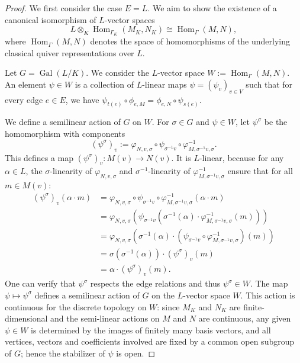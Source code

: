 \documentclass[a4paper,12pt,reqno]{amsart}
\DeclareMathOperator{\Hom}{\mathrm{Hom}}
\DeclareMathOperator{\Gal}{\mathrm {Gal}}
\theoremstyle{plain}
\theoremstyle{remark}
\begin{document}
  \begin{proof}
    We first consider the case $E=L$. We aim to show the existence of a canonical isomorphism of $L$-vector spaces
    \[
    L\otimes_K\Hom_{\Gamma_K}(M_K,N_K) \cong \Hom_{\Gamma}(M, N),
    \]
    where $\Hom_{\Gamma}(M, N)$ denotes the space of homomorphisms of the underlying classical quiver representations over $L$.
    
    Let $G = \Gal(L/K)$. We consider the $L$-vector space $W := \Hom_{\Gamma}(M, N)$. An element $\psi \in W$ is a collection of $L$-linear maps $\psi = (\psi_v)_{v\in V}$ such that for every edge $e \in E$, we have $\psi_{t(e)}\circ \phi_{e,M} = \phi_{e,N}\circ\psi_{s(e)}$.
    
    We define a semilinear action of $G$ on $W$. For $\sigma \in G$ and $\psi \in W$, let $\psi^\sigma$ be the homomorphism with components
    \[
    (\psi^\sigma)_v := \varphi_{N,v,\sigma} \circ \psi_{\sigma^{-1}v} \circ \varphi_{M,\sigma^{-1}v,\sigma}^{-1}.
    \]
    This defines a map $(\psi^\sigma)_v\colon M(v) \to N(v)$. It is $L$-linear, because for any $\alpha \in L$, the $\sigma$-linearity of $\varphi_{N,v,\sigma}$ and $\sigma^{-1}$-linearity of $\varphi_{M,\sigma^{-1}v,\sigma}^{-1}$ ensure that for all $m\in M(v)$:
    \begin{align*}
      (\psi^\sigma)_v(\alpha\cdot m) &= \varphi_{N,v,\sigma} \circ \psi_{\sigma^{-1}v} \circ \varphi_{M,\sigma^{-1}v,\sigma}^{-1}(\alpha\cdot m) \\
      &= \varphi_{N,v,\sigma} \left(\psi_{\sigma^{-1}v} \left(\sigma^{-1}(\alpha)\cdot\varphi_{M,\sigma^{-1}v,\sigma}^{-1}(m)\right)\right) \\
      &= \varphi_{N,v,\sigma} \left(\sigma^{-1}(\alpha)\cdot(\psi_{\sigma^{-1}v} \circ \varphi_{M,\sigma^{-1}v,\sigma}^{-1})(m)\right) \\
      &= \sigma(\sigma^{-1}(\alpha)) \cdot (\psi^\sigma)_v(m)\\
      &= \alpha \cdot (\psi^\sigma)_v(m).
    \end{align*}
    One can verify that $\psi^\sigma$ respects the edge relations and thus $\psi^\sigma \in W$. The map $\psi \mapsto \psi^\sigma$ defines a semilinear action of $G$ on the $L$-vector space $W$. This action is continuous for the discrete topology on $W$: since $M_K$ and $N_K$ are finite-dimensional and the semi-linear actions on $M$ and $N$ are continuous, any given $\psi\in W$ is determined by the images of finitely many basis vectors, and all vertices, vectors and coefficients involved are fixed by a common open subgroup of $G$; hence the stabilizer of $\psi$ is open.
    

\end{proof}
\end{document}
